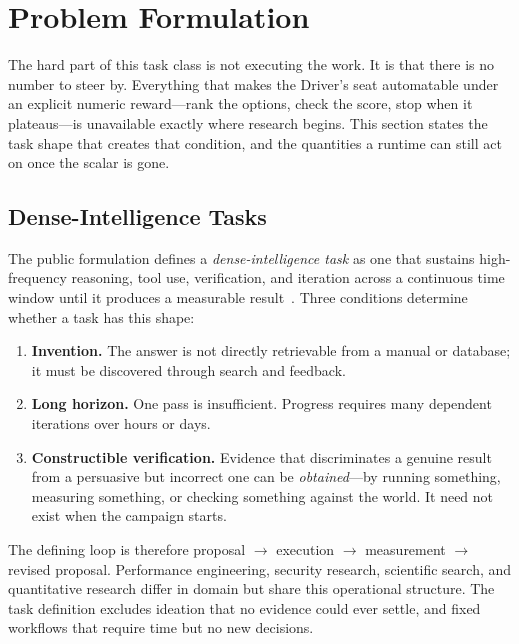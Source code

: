 \section{Problem Formulation}
\label{sec:problem}

The hard part of this task class is not executing the work. It is that there is no
number to steer by. Everything that makes the Driver's seat automatable under an
explicit numeric reward---rank the options, check the score, stop when it
plateaus---is unavailable
exactly where research begins. This section states the task shape that creates that
condition, and the quantities a runtime can still act on once the scalar is gone.

\subsection{Dense-Intelligence Tasks}

The public \systemname formulation defines a \emph{dense-intelligence task} as one that
sustains high-frequency reasoning, tool use, verification, and iteration across a
continuous time window until it produces a measurable result~\citep{argus_site}.
Three conditions determine whether a task has this shape:

\begin{enumerate}[label=\textbf{T\arabic*.}]
  \item \textbf{Invention.} The answer is not directly retrievable from a manual or
    database; it must be discovered through search and feedback.
  \item \textbf{Long horizon.} One pass is insufficient. Progress requires many
    dependent iterations over hours or days.
  \item \textbf{Constructible verification.} Evidence that discriminates a genuine
    result from a persuasive but incorrect one can be \emph{obtained}---by running
    something, measuring something, or checking something against the world. It need
    not exist when the campaign starts.
\end{enumerate}

The defining loop is therefore proposal $\rightarrow$ execution $\rightarrow$
measurement $\rightarrow$ revised proposal. Performance engineering, security
research, scientific search, and quantitative research differ in domain but share
this operational structure. The task definition excludes ideation that no
evidence could ever settle, and fixed workflows that require time but no new
decisions.

